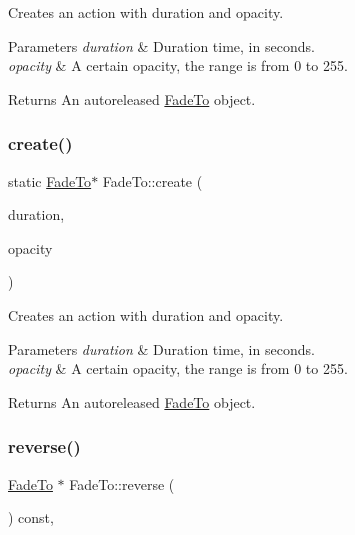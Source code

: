 Creates an action with duration and opacity. 
\begin{DoxyParams}{Parameters}
{\em duration} & Duration time, in seconds. \\
\hline
{\em opacity} & A certain opacity, the range is from 0 to 255. \\
\hline
\end{DoxyParams}
\begin{DoxyReturn}{Returns}
An autoreleased \hyperlink{classFadeTo}{Fade\+To} object. 
\end{DoxyReturn}
\mbox{\label{classFadeTo_a6ab4d18c787e2bbfdee0270e5b00de2b}} 
\subsubsection{\texorpdfstring{create()}{create()}\hspace{0.1cm}{\footnotesize\ttfamily [2/2]}}
{\footnotesize\ttfamily static \hyperlink{classFadeTo}{Fade\+To}$\ast$ Fade\+To\+::create (\begin{DoxyParamCaption}\item[{float}]{duration,  }\item[{G\+Lubyte}]{opacity }\end{DoxyParamCaption})\hspace{0.3cm}{\ttfamily [static]}}

Creates an action with duration and opacity. 
\begin{DoxyParams}{Parameters}
{\em duration} & Duration time, in seconds. \\
\hline
{\em opacity} & A certain opacity, the range is from 0 to 255. \\
\hline
\end{DoxyParams}
\begin{DoxyReturn}{Returns}
An autoreleased \hyperlink{classFadeTo}{Fade\+To} object. 
\end{DoxyReturn}
\mbox{\label{classFadeTo_a40e463b17c90aa34c3ffe0c3dc016742}} 
\subsubsection{\texorpdfstring{reverse()}{reverse()}\hspace{0.1cm}{\footnotesize\ttfamily [1/2]}}
{\footnotesize\ttfamily \hyperlink{classFadeTo}{Fade\+To} $\ast$ Fade\+To\+::reverse (\begin{DoxyParamCaption}\item[{void}]{ }\end{DoxyParamCaption}) const\hspace{0.3cm}{\ttfamily [override]}, {\ttfamily [virtual]}}

